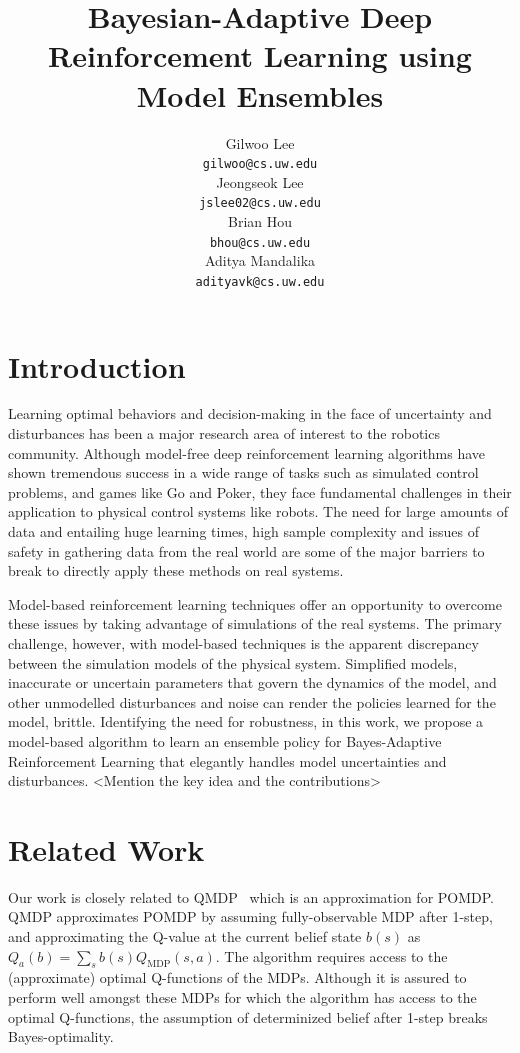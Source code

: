 \documentclass{article}
\title{Bayesian-Adaptive Deep Reinforcement Learning using Model Ensembles}
\author{
  Gilwoo Lee \\ \texttt{gilwoo@cs.uw.edu} \\
  \And
  Jeongseok Lee \\ \texttt{jslee02@cs.uw.edu} \\
  \And
  Brian Hou \\ \texttt{bhou@cs.uw.edu} \\
  \And
  Aditya Mandalika \\ \texttt{adityavk@cs.uw.edu} \\
}
\begin{document}
\maketitle


\section{Introduction}
Learning optimal behaviors and decision-making in the face of uncertainty and disturbances has been a major research area of interest to the robotics community. 
Although model-free deep reinforcement learning algorithms have shown tremendous success in a wide range of tasks such as simulated control problems, and games like Go and Poker, they face fundamental challenges in their application to physical control systems like robots. 
The need for large amounts of data and entailing huge learning times, high sample complexity and issues of safety in gathering data from the real world are some of the major barriers to break to directly apply these methods on real systems.

Model-based reinforcement learning techniques offer an opportunity to overcome these issues by taking advantage of simulations of the real systems. The primary challenge, however, with model-based techniques is the apparent discrepancy between the simulation models of the physical system. Simplified models, inaccurate or uncertain parameters that govern the dynamics of the model, and other unmodelled disturbances and noise can render the policies learned for the model, brittle. Identifying the need for robustness, in this work, we propose a model-based algorithm to learn an ensemble policy for Bayes-Adaptive Reinforcement Learning that elegantly handles model uncertainties and disturbances. 
<Mention the key idea and the contributions>

\section{Related Work}
Our work is closely related to QMDP~\cite{littman1995learning, karkus2017qmdp} which is an approximation for POMDP. QMDP approximates POMDP by assuming fully-observable MDP after 1-step, and approximating the Q-value at the current belief state $b(s)$ as $Q_a(b) =\sum_s b(s)Q_{\text{MDP}}(s, a)$. The algorithm requires access to the (approximate) optimal Q-functions of the MDPs.  Although it is assured to perform well amongst these MDPs for which the algorithm has access to the optimal Q-functions, the assumption of determinized belief after 1-step breaks Bayes-optimality.
\end{document}
